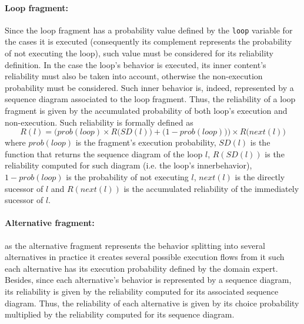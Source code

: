 \paragraph{Loop fragment: \label{subsec:relLoopFragment}}
Since the loop fragment has a probability value defined by the \texttt{loop} variable for
the cases it is executed (consequently its complement represents the probability
of not executing the loop), such value must be considered for its reliability
definition.  In the case the loop's behavior is executed, its inner content's reliability must also be taken into account, otherwise the non-execution probability must be considered. Such
inner behavior is, indeed, represented by a sequence diagram associated to the
loop fragment. Thus, the reliability of a loop fragment is given by the
accumulated probability of both loop's execution and non-execution. Such
reliability is formally defined as \begin{equation} \label{eq:loopFragmentReliability}
	R(l) = \Big(prob(loop) \times R\big(SD(l)\big) + \big(1-prob(loop)\big)\Big) \times
	R\big(next(l)\big) \end{equation} where $prob(loop)$ is the fragment's
execution probability, $SD(l)$ is the function that returns the sequence diagram
of the loop $l$, $R(SD(l))$ is the reliability computed for such diagram (i.e. the loop's innerbehavior), $1-prob(loop)$ is the probability of not executing $l$, $next(l)$ is the directly sucessor of $l$ and
$R(next(l))$ is the accumulated reliability of the immediately sucessor of $l$.

\paragraph{Alternative fragment: \label{subsec:relAlternativeFragment}} as the
alternative fragment represents the behavior splitting into several
alternatives in practice it creates several possible execution flows from it
such each alternative has its execution probability defined by the domain
expert. Besides, since each alternative's behavior is represented by a sequence
diagram, its reliability is given by the reliability computed for its associated
sequence diagram. Thus, the reliability of each alternative is given by its
choice probability multiplied by the reliability computed for its sequence
diagram. 

